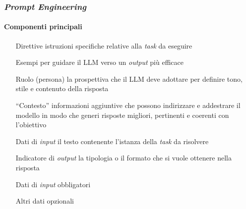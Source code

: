 \begin{frame}[t] \frametitle{\emph{Prompt Engineering}}
\framesubtitle{Componenti principali}
{\small
{}
    \begin{minipage}[t]{\textwidth}
        \begin{itemize}[leftmargin=70pt,align=right]
            \item[\alert{Direttive}] istruzioni specifiche relative alla \textit{task} da eseguire
            \item[\alert{Esempi}] per guidare il LLM verso un \textit{output} più efficace
            \item[\alert{Ruolo (persona)}] la prospettiva che il LLM deve adottare per definire tono, stile e contenuto della risposta
            \item[\alert{``Contesto''}] informazioni aggiuntive che possono indirizzare e addestrare il modello in modo che generi risposte migliori, pertinenti e coerenti con l'obiettivo
            \item[\alert{Dati di \emph{input}}] il testo contenente l'istanza della \textit{task} da risolvere
            \item[\alert{Indicatore di \emph{output}}] la tipologia o il formato che si vuole ottenere nella risposta
        \end{itemize}
        \vspace*{.5cm}
        \begin{itemize}[leftmargin=10pt,align=right]
            \item[\alert{\faArrowCircleRight}] Dati di \emph{input} obbligatori
            \item[\alert{\faArrowCircleRight}] Altri dati opzionali
        \end{itemize}
    \end{minipage}
}
\end{frame}
%
